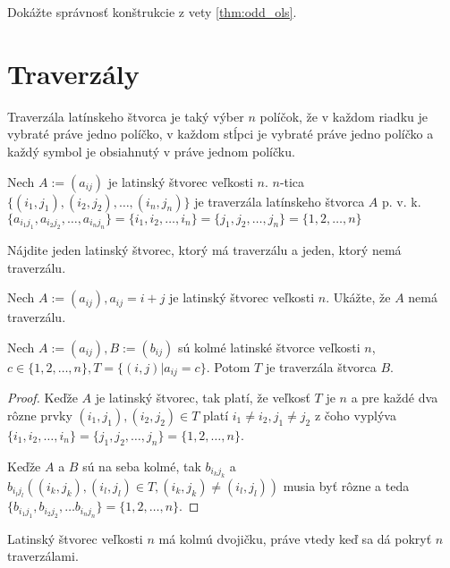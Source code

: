 \begin{exercise}
\label{ex:odd_ols}
Dokážte správnosť konštrukcie z vety \ref{thm:odd_ols}.
\end{exercise}


\section{Traverzály}
Traverzála latínskeho štvorca je taký výber $n$ políčok, že v každom riadku je vybraté práve jedno políčko, v každom stĺpci je vybraté práve jedno políčko a každý symbol je obsiahnutý v práve jednom políčku.

\begin{definition}
Nech $A := (a_{ij})$ je latinský štvorec veľkosti $n$. $n$-tica $\{(i_1, j_1), (i_2,j_2), \dots , (i_n,j_n)\}$ je traverzála latínskeho štvorca $A$ p. v. k.  $\{a_{i_1j_1},a_{i_2j_2}, \dots, a_{i_nj_n}\} = \{i_1, i_2, \dots, i_n \} = \{ j_1, j_2, \dots, j_n\} = \{1, 2, \dots, n \}$
\end{definition}

\begin{exercise}
Nájdite jeden latinský štvorec, ktorý má traverzálu a jeden, ktorý nemá traverzálu. 
\end{exercise}

\begin{exercise}
Nech $A := (a_{ij}),a_{ij} = i+j $ je latinský štvorec veľkosti $n$. Ukážte, že $A$ nemá traverzálu.
\end{exercise}

\begin{theorem}
Nech $A := (a_{ij}), B:=(b_{ij})$ sú kolmé latinské štvorce veľkosti $n$, $c \in \{1,2,\dots,n\} , T = \{ (i,j) | a_{ij} = c\}$. Potom $T$ je traverzála štvorca $B$.
\end{theorem}

\begin{proof}
Keďže $A$ je latinský štvorec, tak platí, že veľkosť $T$ je $n$ a pre každé dva rôzne prvky $(i_1, j_1), (i_2,j_2) \in T$ platí $i_1 \neq i_2 ,j_1 \neq j_2$ 
z čoho vyplýva $\{i_1,i_2, \dots, i_n\} = \{j_1, j_2, \dots, j_n\} = \{ 1, 2, \dots, n\}$.

Keďže $A$ a $B$ sú na seba kolmé, tak $b_{i_k j_k}$ a $b_{i_l j_l} ((i_k, j_k), (i_l, j_l) \in T, (i_k, j_k) \neq (i_l, j_l))$ musia byť rôzne a teda $\{b_{i_1j_1},b_{i_2j_2}, \dots b_{i_nj_n}\} = \{1,2, \dots , n\}$.
\end{proof}

\begin{corollary}
Latinský štvorec veľkosti $n$ má kolmú dvojičku, práve vtedy keď sa dá pokryť $n$ traverzálami.
\end{corollary}


